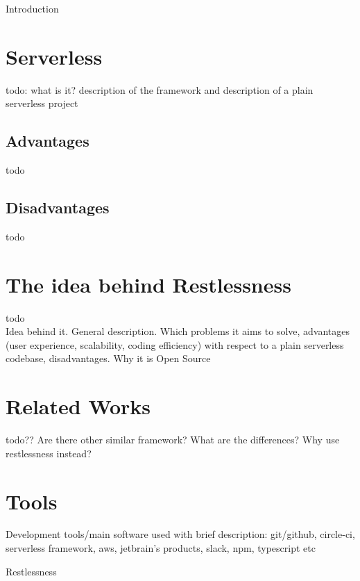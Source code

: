 \begin{mainmatter}

    \begin{chapter}{Introduction}
        \label{chap:intro}

        \section{Serverless}
        todo: what is it? description of the framework and description of a plain serverless
        project

        \subsection{Advantages}
        todo

        \subsection{Disadvantages}
        todo

        \section{The idea behind Restlessness}
        todo\\
        Idea behind it. General description. Which problems it aims to solve, advantages (user experience,
        scalability, coding efficiency) with respect to a plain serverless codebase,
        disadvantages. Why it is Open Source

        \section{Related Works}
        todo??
        Are there other similar framework? What are the differences? Why use restlessness instead?

        \section{Tools}
        Development tools/main software used with brief description: git/github, circle-ci, serverless framework,
        aws, jetbrain's products, slack, npm, typescript etc

    \end{chapter}


    \begin{chapter}{Restlessness}
        \label{chap:restlessness}


\end{chapter}
\end{mainmatter}
